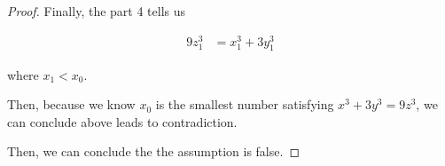 \documentclass[12pt]{article}
\begin{document}
\begin{itemize}
\begin{proof}
        \bigskip

        Finally, the part 4 tells us

        \begin{align}
            9z_1^3 &= x_1^3 + 3y_1^3
        \end{align}

        where $x_1 < x_0$.

        \bigskip

        Then, because we know $x_0$ is the smallest
        number satisfying $x^3 + 3y^3 = 9z^3$, we can conclude above leads to
        contradiction.

        \bigskip

        Then, we can conclude the the assumption is false.

    \end{proof}
\end{itemize}















\end{document}
